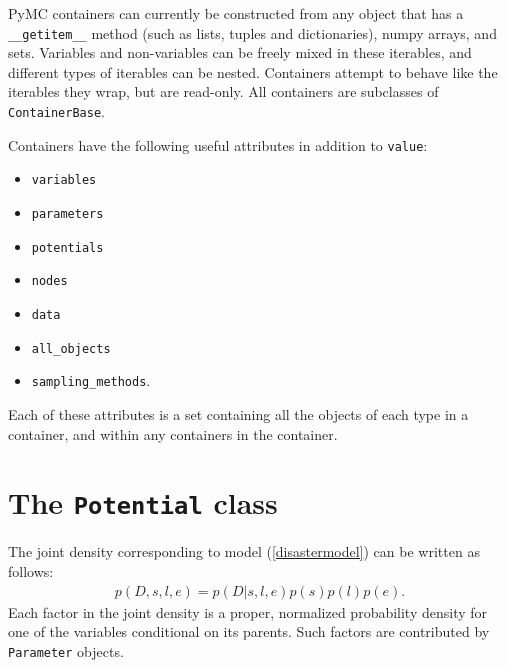 PyMC containers can currently be constructed from any object that has a \texttt{\_\_getitem\_\_} method (such as lists, tuples and dictionaries), numpy arrays, and sets. Variables and non-variables can be freely mixed in these iterables, and different types of iterables can be nested. Containers attempt to behave like the iterables they wrap, but are read-only. All containers are subclasses of \texttt{ContainerBase}.

Containers have the following useful attributes in addition to \texttt{value}:
\begin{itemize}
    \item\texttt{variables}
    \item\texttt{parameters}
    \item\texttt{potentials}
    \item\texttt{nodes}
    \item\texttt{data}
    \item\texttt{all_objects}
    \item\texttt{sampling_methods}.
\end{itemize}
Each of these attributes is a set containing all the objects of each type in a container, and within any containers in the container.

\section{The \texttt{Potential} class}

The joint density corresponding to model (\ref{disastermodel}) can be written as follows:
\begin{eqnarray*}
    p(D,s,l,e) = p(D|s,l,e) p(s) p(l) p(e).
\end{eqnarray*}
Each factor in the joint density is a proper, normalized probability density for one of the variables conditional on its parents. Such factors are contributed by \texttt{Parameter} objects.


